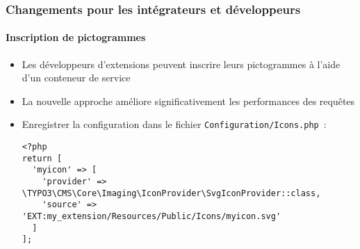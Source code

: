 %

\begin{frame}[fragile]
	\frametitle{Changements pour les intégrateurs et développeurs}
	\framesubtitle{Inscription de pictogrammes}


	\begin{itemize}
		\item Les développeurs d'extensions peuvent inscrire leurs pictogrammes à l'aide d'un conteneur de service
		\item La nouvelle approche améliore significativement les performances des requêtes
		\item Enregistrer la configuration dans le fichier \texttt{Configuration/Icons.php}~:
\begin{lstlisting}
<?php
return [
  'myicon' => [
    'provider' => \TYPO3\CMS\Core\Imaging\IconProvider\SvgIconProvider::class,
    'source' => 'EXT:my_extension/Resources/Public/Icons/myicon.svg'
  ]
];
\end{lstlisting}

	\end{itemize}

\end{frame}

